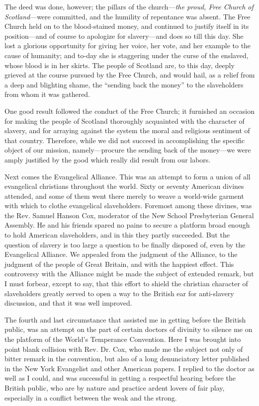 The deed was done, however; the pillars of the church---\emph{the proud,
Free Church of Scotland}---were committed, and the humility of
repentance was absent. The Free Church held on to the blood-stained
money, and continued to justify itself in its position---and of course
to apologize for slavery---and does so till this day. She lost a
glorious opportunity for giving her voice, her vote, and her example to
the cause of humanity; and to-day she is staggering under the curse of
the enslaved, whose blood is in her skirts. The people of Scotland are,
to this day, deeply grieved at the course pursued by the Free Church,
and would hail, as a relief from a deep and blighting shame, the
``sending back the money'' to the slaveholders from whom it was
gathered.

One good result followed the conduct of the Free Church; it furnished an
occasion for making the people of Scotland thoroughly acquainted with
the character of slavery, and for arraying against the system the moral
and religious sentiment of that country. Therefore, while we did not
succeed in accomplishing the specific object of our mission,
namely---procure the sending back of the money---we were amply justified
by the good which really did result from our labors.

Next comes the Evangelical Alliance. This was an attempt to form a union
of all evangelical {\protect\hypertarget{387}{}{}}christians throughout
the world. Sixty or seventy American divines attended, and some of them
went there merely to weave a world-wide garment with which to clothe
evangelical slaveholders. Foremost among these divines, was the Rev.
Samuel Hanson Cox, moderator of the New School Presbyterian General
Assembly. He and his friends spared no pains to secure a platform broad
enough to hold American slaveholders, and in this they partly succeeded.
But the question of slavery is too large a question to be finally
disposed of, even by the Evangelical Alliance. We appealed from the
judgment of the Alliance, to the judgment of the people of Great
Britain, and with the happiest effect. This controversy with the
Alliance might be made the subject of extended remark, but I must
forbear, except to say, that this effort to shield the christian
character of slaveholders greatly served to open a way to the British
ear for anti-slavery discussion, and that it was well improved.

The fourth and last circumstance that assisted me in getting before the
British public, was an attempt on the part of certain doctors of
divinity to silence me on the platform of the World's Temperance
Convention. Here I was brought into point blank collision with Rev. Dr.
Cox, who made me the subject not only of bitter remark in the
convention, but also of a long denunciatory letter published in the New
York Evangelist and other American papers. I replied to the doctor as
well as I could, and was successful in getting a respectful hearing
before the British public, who are by nature and practice ardent
{\protect\hypertarget{388}{}{}}lovers of fair play, especially in a
conflict between the weak and the strong.

